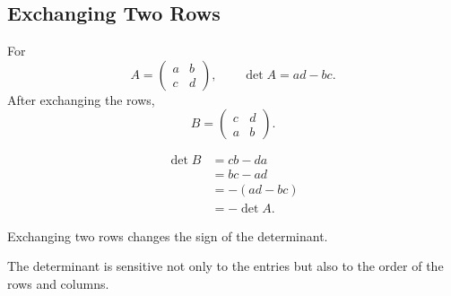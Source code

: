 \subsection{Exchanging Two Rows}

For
\[
A=\begin{pmatrix}a&b\\c&d\end{pmatrix},
\qquad
\det A=ad-bc.
\]
After exchanging the rows,
\[
B=\begin{pmatrix}c&d\\a&b\end{pmatrix}.
\]

\begin{proofbox}
\begin{align*}
\det B
&=cb-da\\
&=bc-ad\\
&=-(ad-bc)\\
&=-\det A.
\end{align*}
\end{proofbox}

\begin{theorembox}
Exchanging two rows changes the sign of the determinant.
\end{theorembox}

\begin{interpretationbox}
The determinant is sensitive not only to the entries but also to the order of the rows and columns.
\end{interpretationbox}
